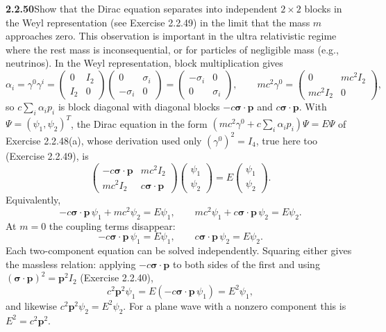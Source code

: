 \par\bigskip
\noindent\textbf{2.2.50}\quad Show that the Dirac equation separates into
independent $2\times2$ blocks in the Weyl representation (see Exercise 2.2.49)
in the limit that the mass $m$ approaches zero. This observation is important
in the ultra relativistic regime where the rest mass is inconsequential, or
for particles of negligible mass (e.g., neutrinos).
\solution
{}
In the Weyl representation, block multiplication gives
\[
\alpha_i=\gamma^0\gamma^i=
\begin{pmatrix}0&I_2\\I_2&0\end{pmatrix}
\begin{pmatrix}0&\sigma_i\\-\sigma_i&0\end{pmatrix}
=\begin{pmatrix}-\sigma_i&0\\0&\sigma_i\end{pmatrix},
\qquad
mc^2\gamma^0=\begin{pmatrix}0&mc^2I_2\\mc^2I_2&0\end{pmatrix},
\]
so $c\sum_i\alpha_ip_i$ is block diagonal with diagonal blocks
$-c\boldsymbol{\sigma}\cdot\mathbf p$ and
$c\boldsymbol{\sigma}\cdot\mathbf p$.
With $\Psi=(\psi_1,\psi_2)^T$, the Dirac equation in the form
$(mc^2\gamma^0+c\sum_i\alpha_ip_i)\Psi=E\Psi$ of Exercise 2.2.48(a),
whose derivation used only $(\gamma^0)^2=I_4$, true here too
(Exercise 2.2.49), is
\[
\begin{pmatrix}
-c\boldsymbol{\sigma}\cdot\mathbf p&mc^2I_2\\
mc^2I_2&c\boldsymbol{\sigma}\cdot\mathbf p
\end{pmatrix}
\begin{pmatrix}\psi_1\\\psi_2\end{pmatrix}
=E\begin{pmatrix}\psi_1\\\psi_2\end{pmatrix}.
\]
Equivalently,
\[
-c\boldsymbol{\sigma}\cdot\mathbf p\,\psi_1+mc^2\psi_2=E\psi_1,\qquad
mc^2\psi_1+c\boldsymbol{\sigma}\cdot\mathbf p\,\psi_2=E\psi_2.
\]
At $m=0$ the coupling terms disappear:
\[
\boxed{-c\boldsymbol{\sigma}\cdot\mathbf p\,\psi_1=E\psi_1,\qquad
c\boldsymbol{\sigma}\cdot\mathbf p\,\psi_2=E\psi_2}.
\]
Each two-component equation can be solved independently. Squaring
either gives the massless relation: applying
$-c\boldsymbol{\sigma}\cdot\mathbf p$ to both sides of the first and
using $(\boldsymbol{\sigma}\cdot\mathbf p)^2=\mathbf p^2I_2$
(Exercise 2.2.40),
\[
c^2\mathbf p^2\psi_1=E(-c\boldsymbol{\sigma}\cdot\mathbf p\,\psi_1)
=E^2\psi_1,
\]
and likewise $c^2\mathbf p^2\psi_2=E^2\psi_2$. For a plane wave with a
nonzero component this is $E^2=c^2\mathbf p^2$.

